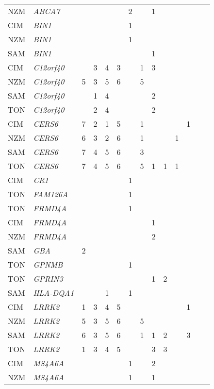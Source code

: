 \documentclass[]{report}
\begin{document}
\begin{ThreePartTable}
\begin{longtable}[t]{llllllllllllll}
NZM & \em{ABCA7} &  &  &  &  & 2 &  & 1 &  &  &  &  & \\
CIM & \em{BIN1} &  &  &  &  & 1 &  &  &  &  &  &  & \\
NZM & \em{BIN1} &  &  &  &  & 1 &  &  &  &  &  &  & \\
SAM & \em{BIN1} &  &  &  &  &  &  & 1 &  &  &  &  & \\
CIM & \em{C12orf40} &  & 3 & 4 & 3 &  & 1 & 3 &  &  &  &  & \\
NZM & \em{C12orf40} & 5 & 3 & 5 & 6 &  & 5 &  &  &  &  &  & \\
SAM & \em{C12orf40} &  & 1 & 4 &  &  &  & 2 &  &  &  &  & \\
TON & \em{C12orf40} &  & 2 & 4 &  &  &  & 2 &  &  &  &  & \\
CIM & \em{CERS6} & 7 & 2 & 1 & 5 &  & 1 &  &  &  & 1 &  & \\
NZM & \em{CERS6} & 6 & 3 & 2 & 6 &  & 1 &  &  & 1 &  &  & \\
SAM & \em{CERS6} & 7 & 4 & 5 & 6 &  & 3 &  &  &  &  &  & \\
TON & \em{CERS6} & 7 & 4 & 5 & 6 &  & 5 & 1 & 1 & 1 &  &  & \\
CIM & \em{CR1} &  &  &  &  & 1 &  &  &  &  &  &  & \\
TON & \em{FAM126A} &  &  &  &  & 1 &  &  &  &  &  &  & \\
TON & \em{FRMD4A} &  &  &  &  & 1 &  &  &  &  &  &  & \\
CIM & \em{FRMD4A} &  &  &  &  &  &  & 1 &  &  &  &  & \\
NZM & \em{FRMD4A} &  &  &  &  &  &  & 2 &  &  &  &  & \\
SAM & \em{GBA} & 2 &  &  &  &  &  &  &  &  &  &  & \\
TON & \em{GPNMB} &  &  &  &  & 1 &  &  &  &  &  &  & \\
TON & \em{GPRIN3} &  &  &  &  &  &  & 1 & 2 &  &  &  & \\
SAM & \em{HLA-DQA1} &  &  & 1 &  & 1 &  &  &  &  &  &  & \\
CIM & \em{LRRK2} & 1 & 3 & 4 & 5 &  &  &  &  &  & 1 &  & \\
NZM & \em{LRRK2} & 5 & 3 & 5 & 6 &  & 5 &  &  &  &  &  & \\
SAM & \em{LRRK2} & 6 & 3 & 5 & 6 &  & 1 & 1 & 2 &  & 3 &  & \\
TON & \em{LRRK2} & 1 & 3 & 4 & 5 &  &  & 3 & 3 &  &  &  & \\
CIM & \em{MS4A6A} &  &  &  &  & 1 &  & 2 &  &  &  &  & \\
NZM & \em{MS4A6A} &  &  &  &  & 1 &  & 1 &  &  &  &  & \\

\end{longtable}
\end{ThreePartTable}
\end{document}

